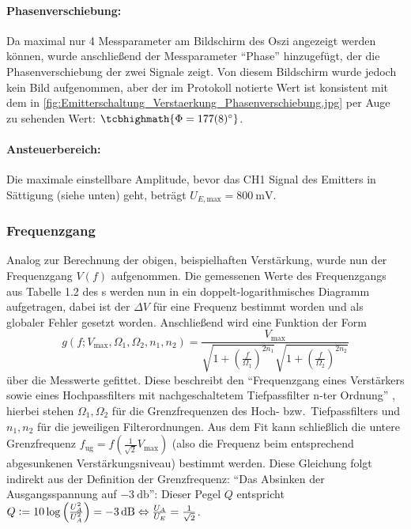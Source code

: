 \paragraph{Phasenverschiebung:} Da maximal nur 4 Messparameter am Bildschirm des Oszi angezeigt werden können, wurde anschließend der Messparameter \enquote{Phase} hinzugefügt, der die Phasenverschiebung der zwei Signale zeigt. Von diesem Bildschirm wurde jedoch kein Bild aufgenommen, aber der im Protokoll notierte Wert ist konsistent mit dem in \cref{fig:Emitterschaltung_Verstaerkung_Phasenverschiebung.jpg} per Auge zu sehenden Wert: \(\tcbhighmath{\Phi=\ang{177(8)}}\).
\clearpage
\paragraph{Ansteuerbereich:} Die maximale einstellbare Amplitude, bevor das CH1 Signal des Emitters in Sättigung (siehe unten) geht, beträgt \(U_{E,\text{max}}=\qty{800}{\milli\volt}\).
\FloatBarrier

\subsubsection{Frequenzgang}
Analog zur Berechnung der obigen, beispielhaften Verstärkung, wurde nun der Frequenzgang \(V(f)\) aufgenommen. 
Die gemessenen Werte des Frequenzgangs aus Tabelle 1.2 des s werden nun in ein doppelt-logarithmisches Diagramm aufgetragen, dabei ist der \(\Delta V\) für eine Frequenz bestimmt worden und als globaler Fehler gesetzt worden. Anschließend wird eine Funktion der Form
\begin{equation}
  g (f; V_\text{{max}}, \Omega_1, \Omega_2, n_1, n_2) = \frac{V_\text{max}}{\sqrt{1 + \left(\frac{f}{\Omega_1}\right)^{2n_1}} \sqrt{1 + \left(\frac{f}{\Omega_2}\right)^{2n_2}}}
\end{equation}
über die Messwerte gefittet. Diese beschreibt den \enquote{Frequenzgang eines Verstärkers sowie eines Hochpassfilters mit nachgeschaltetem Tiefpassfilter n-ter Ordnung} \cite[vgl.][42]{Skript_2.2}, hierbei stehen \(\Omega_1, \Omega_2\) für die Grenzfrequenzen des Hoch- bzw.\ Tiefpassfilters und \(n_1,n_2\) für die jeweiligen Filterordnungen. Aus dem Fit kann schließlich die untere Grenzfrequenz \(f_\text{ug}=f\left(\tfrac{1}{\sqrt{2}}V_{\text{max}}\right)\) (also die Frequenz beim entsprechend abgesunkenen Verstärkungsniveau) bestimmt werden. Diese Gleichung folgt indirekt aus der Definition der Grenzfrequenz: \enquote{Das Absinken der Ausgangsspannung auf \(\qty{-3}{\decibel}\)}: Dieser Pegel \(Q\) entspricht \(Q\defeq 10\log\left(\frac{U_A^2}{U_A^2}\right)=\qty{-3}{\decibel}\Leftrightarrow \frac{U_A}{U_E}=\frac{1}{\sqrt{2}}\).

